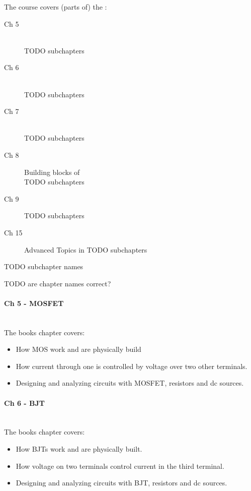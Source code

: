 The course covers (parts of) the :

\begin{description}
  \item [Ch 5]  \\
    TODO subchapters
  \item [Ch 6]  \\
    TODO subchapters
  \item [Ch 7]  \\
    TODO subchapters
  \item [Ch 8] Building blocks of  \\
    TODO subchapters
  \item [Ch 9] 
    TODO subchapters
  \item [Ch 15] Advanced Topics in 
    TODO subchapters
\end{description}

TODO subchapter names

TODO are chapter names correct?

\paragraph{Ch 5 - MOSFET} \hfill \\
The books chapter covers:
\begin{itemize}
  \item How MOS  work and are physically build
  \item How current through one  is controlled by voltage
        over two other terminals.
  \item Designing and analyzing circuits with MOSFET, resistors and dc sources.
\end{itemize}

\paragraph{Ch 6 - BJT} \hfill \\
The books chapter covers:
\begin{itemize}
  \item How BJTs work and are physically built.
  \item How voltage on two terminals control current in the third terminal.
  \item Designing and analyzing circuits with BJT, resistors and dc sources.
\end{itemize}

